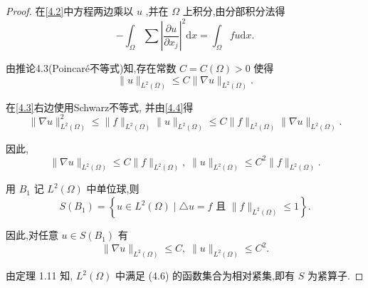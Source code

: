 \documentclass[lang=cn,newtx,10pt,scheme=chinese,thmcnt=chapter]{elegantbook}
\newcommand{\dif}{\mathrm{d}}
\begin{document}
\begin{proof}
    在\ref{4.2}中方程两边乘以 \(u\) ,并在 \(\Omega\) 上积分,由分部积分法得
\begin{equation}
- {\int }_{\Omega }\sum {\left| \frac{\partial u}{\partial {x}_{j}}\right| }^{2}{\dif x} = {\int }_{\Omega }{fu\dif x}. \label{4.3}
\end{equation}

由推论4.3(Poincaré不等式)知,存在常数 \(C = C\left( \Omega \right)  > 0\) 使得
\begin{equation}
\parallel u{\parallel }_{{L}^{2}\left( \Omega \right) } \leqslant  C\parallel \nabla u{\parallel }_{{L}^{2}\left( \Omega \right) }. \label{4.4}
\end{equation}

在\ref{4.3}右边使用Schwarz不等式, 并由\ref{4.4}得
\begin{equation*}
\parallel \nabla u{\parallel }_{{L}^{2}\left( \Omega \right) }^{2} \leqslant  \parallel f{\parallel }_{{L}^{2}\left( \Omega \right) }\parallel u{\parallel }_{{L}^{2}\left( \Omega \right) } \leqslant  C\parallel f{\parallel }_{{L}^{2}\left( \Omega \right) }\parallel \nabla u{\parallel }_{{L}^{2}\left( \Omega \right) }.
\end{equation*}

因此,
\begin{equation}
\parallel \nabla u{\parallel }_{{L}^{2}\left( \Omega \right) } \leqslant  C\parallel f{\parallel }_{{L}^{2}\left( \Omega \right) },\;\parallel u{\parallel }_{{L}^{2}\left( \Omega \right) } \leqslant  {C}^{2}\parallel f{\parallel }_{{L}^{2}\left( \Omega \right) }. \label{4.5}
\end{equation}

用 \({B}_{1}\) 记 \({L}^{2}\left( \Omega \right)\) 中单位球,则
\begin{equation*}
S\left( {B}_{1}\right)  = \left\{  {u \in  {L}^{2}\left( \Omega \right)  \mid  \bigtriangleup u = f\text{ 且 }\parallel f{\parallel }_{{L}^{2}\left( \Omega \right) } \leqslant  1}\right\}  .
\end{equation*}

因此,对任意 \(u \in  S\left( {B}_{1}\right)\) 有
\begin{equation}
\parallel \nabla u{\parallel }_{{L}^{2}\left( \Omega \right) } \leqslant  C,\;\parallel u{\parallel }_{{L}^{2}\left( \Omega \right) } \leqslant  {C}^{2}. \label{4.6}
\end{equation}

由定理 1.11 知, \({L}^{2}\left( \Omega \right)\) 中满足 (4.6) 的函数集合为相对紧集,即有 \(S\) 为紧算子.
\end{proof}
\end{document}
